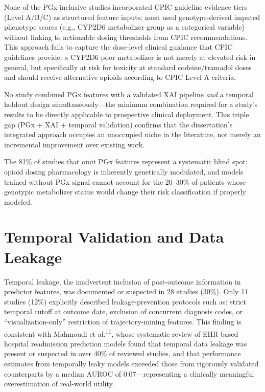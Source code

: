 \documentclass[
  12pt,
]{book}
\begin{document}
None of the PGx-inclusive studies incorporated CPIC guideline evidence
tiers (Level A/B/C) as structured feature inputs; most used
genotype-derived imputed phenotype scores (e.g., CYP2D6 metabolizer
group as a categorical variable) without linking to actionable dosing
thresholds from CPIC recommendations. This approach fails to capture the
dose-level clinical guidance that CPIC guidelines provide: a CYP2D6 poor
metabolizer is not merely at elevated risk in general, but specifically
at risk for toxicity at standard codeine/tramadol doses and should
receive alternative opioids according to CPIC Level A criteria.

No study combined PGx features with a validated XAI pipeline \emph{and}
a temporal holdout design simultaneously---the minimum combination
required for a study's results to be directly applicable to prospective
clinical deployment. This triple gap (PGx + XAI + temporal validation)
confirms that the dissertation's integrated approach occupies an
unoccupied niche in the literature, not merely an incremental
improvement over existing work.

The 81\% of studies that omit PGx features represent a systematic blind
spot: opioid dosing pharmacology is inherently genetically modulated,
and models trained without PGx signal cannot account for the 20--30\% of
patients whose genotypic metabolizer status would change their risk
classification if properly modeled.

\section{Temporal Validation and Data Leakage}\label{sec-leakage}

Temporal leakage, the inadvertent inclusion of post-outcome information
in predictor features, was documented or suspected in 28 studies (30\%).
Only 11 studies (12\%) explicitly described leakage-prevention protocols
such as: strict temporal cutoff at outcome date, exclusion of concurrent
diagnosis codes, or ``visualization-only'' restriction of
trajectory-mining features. This finding is consistent with Mahmoudi et
al.\textsuperscript{11}, whose systematic review of EHR-based hospital
readmission prediction models found that temporal data leakage was
present or suspected in over 40\% of reviewed studies, and that
performance estimates from temporally leaky models exceeded those from
rigorously validated counterparts by a median AUROC of
0.07---representing a clinically meaningful overestimation of real-world
utility.
\end{document}
